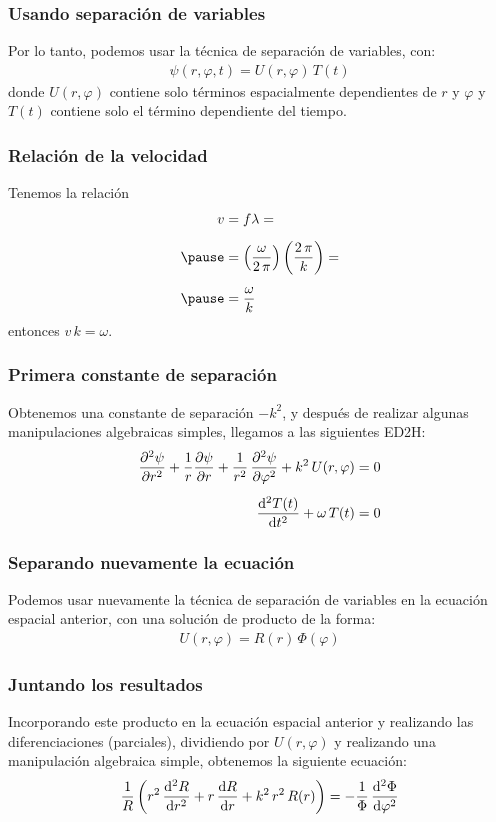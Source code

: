 \documentclass[12pt]{beamer}
\begin{document}
\begin{frame}
\frametitle{Usando separación de variables}
Por lo tanto, podemos usar la técnica de separación de variables, con:
\pause
\begin{align*}
\psi (r, \varphi, t) = U(r, \varphi) \, T(t)
\end{align*}
\pause
donde $U (r, \varphi)$ contiene solo términos espacialmente dependientes de $r$ y $\varphi$ y $T (t)$ contiene solo el término dependiente del tiempo.
\end{frame}
\begin{frame}
\frametitle{Relación de la velocidad}
Tenemos la relación
\begin{eqnarray*}
\begin{aligned}
v &= f \lambda = \\[0.5em] \pause
&=  \left( \dfrac{\omega}{2 \, \pi} \right) \left( \dfrac{2 \, \pi}{k} \right) = \\[0.5em] \pause
&= \dfrac{\omega}{k}
\end{aligned}
\end{eqnarray*}
\pause
entonces $v \, k = \omega$.
\end{frame}
\begin{frame}
\frametitle{Primera constante de separación}
Obtenemos una constante de separación $-k^{2}$, \pause y después de realizar algunas manipulaciones algebraicas simples, llegamos a las siguientes ED2H:
\pause
\begin{eqnarray*}
\begin{aligned}
\pdv[2]{\psi}{r} + \dfrac{1}{r} \pdv{\psi}{r} + \dfrac{1}{r^{2}} \, \pdv[2]{\psi}{\varphi} + k^{2} \, U(r, \varphi) &= 0\\[0.5em]
\dv[2]{T(t)}{t} + \omega \, T(t) &= 0
\end{aligned}
\end{eqnarray*}
\end{frame}
\begin{frame}
\frametitle{Separando nuevamente la ecuación}
Podemos usar nuevamente la técnica de separación de variables en la ecuación espacial anterior, \pause con una solución de producto de la forma:
\pause
\begin{align*}
U(r, \varphi) = R(r) \, \Phi (\varphi)
\end{align*}
\end{frame}
\begin{frame}
\frametitle{Juntando los resultados}
Incorporando este producto en la ecuación espacial anterior y realizando las diferenciaciones (parciales), \pause dividiendo por $U(r, \varphi)$ y realizando una manipulación algebraica simple, \pause obtenemos la siguiente ecuación:
\pause
\begin{align*}
\dfrac{1}{R} \left( r^{2} \, \dv[2]{R}{r} +  r \, \dv{R}{r} + k^{2} \, r^{2} \, R(r) \right) = - \dfrac{1}{\Phi} \, \dv[2]{\Phi}{\varphi}
\end{align*}
\end{frame}
\end{document}
